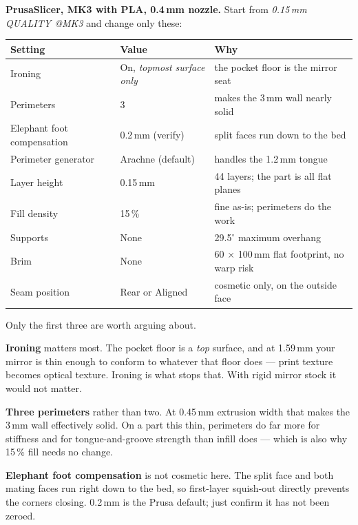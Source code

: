 \documentclass[letterpaper,11pt]{article}
\begin{document}
\medskip

\textbf{PrusaSlicer, MK3 with PLA, 0.4\,mm nozzle.} Start from
\emph{0.15\,mm QUALITY @MK3} and change only these:

\begin{center}
\begin{tabular}{@{}lll@{}}
\toprule
\textbf{Setting} & \textbf{Value} & \textbf{Why} \\
\midrule
Ironing & On, \emph{topmost surface only} & the pocket floor is the mirror seat \\
Perimeters & 3 & makes the 3\,mm wall nearly solid \\
Elephant foot compensation & 0.2\,mm (verify) & split faces run down to the bed \\
Perimeter generator & Arachne (default) & handles the 1.2\,mm tongue \\
Layer height & 0.15\,mm & 44 layers; the part is all flat planes \\
Fill density & 15\,\% & fine as-is; perimeters do the work \\
Supports & None & 29.5$^\circ$ maximum overhang \\
Brim & None & 60 $\times$ 100\,mm flat footprint, no warp risk \\
Seam position & Rear or Aligned & cosmetic only, on the outside face \\
\bottomrule
\end{tabular}
\end{center}

\medskip

Only the first three are worth arguing about.

\textbf{Ironing} matters most. The pocket floor is a \emph{top} surface, and at 1.59\,mm your
mirror is thin enough to conform to whatever that floor does --- print texture becomes optical
texture. Ironing is what stops that. With rigid mirror stock it would not matter.

\textbf{Three perimeters} rather than two. At 0.45\,mm extrusion width that makes the 3\,mm
wall effectively solid. On a part this thin, perimeters do far more for stiffness and for
tongue-and-groove strength than infill does --- which is also why 15\,\% fill needs no change.

\textbf{Elephant foot compensation} is not cosmetic here. The split face and both mating faces
run right down to the bed, so first-layer squish-out directly prevents the corners closing.
0.2\,mm is the Prusa default; just confirm it has not been zeroed.
\end{document}
